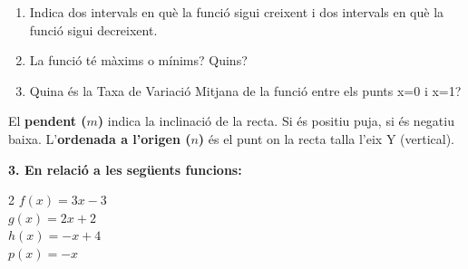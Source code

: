 \documentclass[12pt,a4paper]{article}
\begin{document}
\begin{center}
\end{center}

\begin{enumerate}[label=\alph*)]
    \item Indica dos intervals en què la funció sigui creixent i dos intervals en què la funció sigui decreixent. \vspace{1.5cm}
    \item La funció té màxims o mínims? Quins? \vspace{1.5cm}
    \item Quina és la Taxa de Variació Mitjana de la funció entre els punts x=0 i x=1? \vspace{1.5cm}
\end{enumerate}
\newpage
\begin{capsula}
El \textbf{pendent ($m$)} indica la inclinació de la recta. Si és positiu puja, si és negatiu baixa. L'\textbf{ordenada a l'origen ($n$)} és el punt on la recta talla l'eix Y (vertical).
\end{capsula}

\textbf{3. En relació a les següents funcions:}
\begin{multicols}{2}
$f(x) = 3x - 3$ \\
$g(x) = 2x + 2$ \\
$h(x) = -x + 4$ \\
$p(x) = -x$
\end{multicols}
\end{document}
